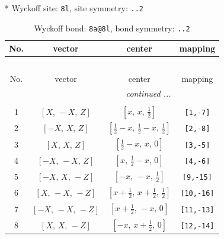 \documentclass[fleqn,8pt]{jsarticle}
\begin{document}
* Wyckoff site: {\tt 8l}, site symmetry: {\tt ..2}
\renewcommand{\arraystretch}{1.2}
\begin{longtable}{cccc}
\caption{Wyckoff bond: {\tt 8a@8l}, bond symmetry: {\tt ..2}}
 \\
 \hline \hline
No. & vector & center & mapping \\ \hline \endfirsthead

\multicolumn{3}{l}{\tablename\ \thetable{}} \\
 \hline \hline
No. & vector & center & mapping \\ \hline \endhead

 \hline \hline
\multicolumn{3}{r}{\footnotesize\it continued ...} \\ \endfoot

 \hline \hline
\multicolumn{3}{r}{} \\ \endlastfoot

1 & $\left[ X,\, - X,\, Z \right]$ & $\left[ x,\, x,\, \frac{1}{2} \right]$ & {\tt [1,-7]} \\ \hline
2 & $\left[ - X,\, X,\, Z \right]$ & $\left[ \frac{1}{2} - x,\, \frac{1}{2} - x,\, \frac{1}{2} \right]$ & {\tt [2,-8]} \\ \hline
3 & $\left[ X,\, X,\, Z \right]$ & $\left[ \frac{1}{2} - x,\, x,\, 0 \right]$ & {\tt [3,-5]} \\ \hline
4 & $\left[ - X,\, - X,\, Z \right]$ & $\left[ x,\, \frac{1}{2} - x,\, 0 \right]$ & {\tt [4,-6]} \\ \hline
5 & $\left[ - X,\, X,\, - Z \right]$ & $\left[ - x,\, - x,\, \frac{1}{2} \right]$ & {\tt [9,-15]} \\ \hline
6 & $\left[ X,\, - X,\, - Z \right]$ & $\left[ x + \frac{1}{2},\, x + \frac{1}{2},\, \frac{1}{2} \right]$ & {\tt [10,-16]} \\ \hline
7 & $\left[ - X,\, - X,\, - Z \right]$ & $\left[ x + \frac{1}{2},\, - x,\, 0 \right]$ & {\tt [11,-13]} \\ \hline
8 & $\left[ X,\, X,\, - Z \right]$ & $\left[ - x,\, x + \frac{1}{2},\, 0 \right]$ & {\tt [12,-14]} \\
\end{longtable}
\renewcommand{\arraystretch}{1.2}
\end{document}

